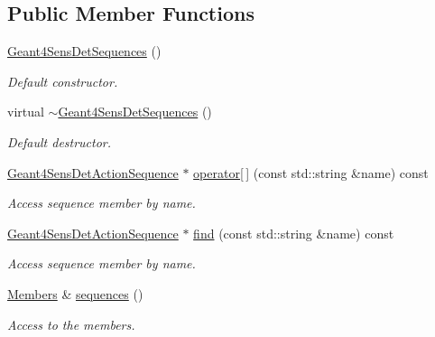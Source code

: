 \subsection*{Public Member Functions}
\begin{DoxyCompactItemize}
\item 
\hyperlink{class_d_d4hep_1_1_simulation_1_1_geant4_sens_det_sequences_a5a78304dcb1472bf7a7de1b4305a264f}{Geant4SensDetSequences} ()
\begin{DoxyCompactList}\small\item\em Default constructor. \item\end{DoxyCompactList}\item 
virtual \hyperlink{class_d_d4hep_1_1_simulation_1_1_geant4_sens_det_sequences_a6f27557827175da8f038b84959cb109d}{$\sim$Geant4SensDetSequences} ()
\begin{DoxyCompactList}\small\item\em Default destructor. \item\end{DoxyCompactList}\item 
\hyperlink{class_d_d4hep_1_1_simulation_1_1_geant4_sens_det_action_sequence}{Geant4SensDetActionSequence} $\ast$ \hyperlink{class_d_d4hep_1_1_simulation_1_1_geant4_sens_det_sequences_ac9ce2f754375eef699ff1a05c1759c03}{operator\mbox{[}$\,$\mbox{]}} (const std::string \&name) const 
\begin{DoxyCompactList}\small\item\em Access sequence member by name. \item\end{DoxyCompactList}\item 
\hyperlink{class_d_d4hep_1_1_simulation_1_1_geant4_sens_det_action_sequence}{Geant4SensDetActionSequence} $\ast$ \hyperlink{class_d_d4hep_1_1_simulation_1_1_geant4_sens_det_sequences_a3eab0a62ebd3ebf84c311732e40bc162}{find} (const std::string \&name) const 
\begin{DoxyCompactList}\small\item\em Access sequence member by name. \item\end{DoxyCompactList}\item 
\hyperlink{class_d_d4hep_1_1_simulation_1_1_geant4_sens_det_sequences_a2266138a517dd9b784af9234312fdd12}{Members} \& \hyperlink{class_d_d4hep_1_1_simulation_1_1_geant4_sens_det_sequences_a40e7646be1758328d5bf58213b320bf9}{sequences} ()
\begin{DoxyCompactList}\small\item\em Access to the members. \item\end{DoxyCompactList}\item 

\end{DoxyCompactItemize}
